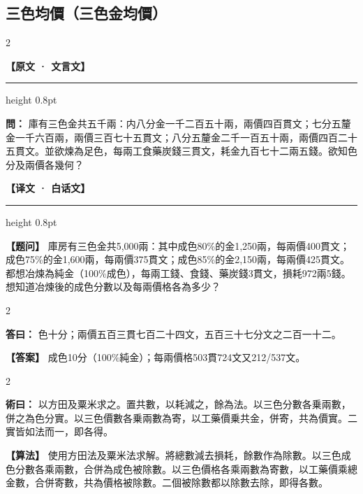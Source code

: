 \documentclass[11pt,a4paper]{article}
\newcommand{\ClassicalQuestion}[1]{\par\noindent\textbf{\color{problemcolor}問：}#1\par}
\newcommand{\ClassicalAnswer}[1]{\par\noindent\textbf{\color{answercolor}答曰：}#1\par}
\newcommand{\ClassicalMethod}[1]{\par\noindent\textbf{\color{methodcolor}術曰：}#1\par}
\newcommand{\ModernQuestion}[1]{\par\noindent\textbf{\color{modernlabel}【题问】}#1\par}
\newcommand{\ModernAnswer}[1]{\par\noindent\textbf{\color{answercolor}【答案】}#1\par}
\newcommand{\ModernMethod}[1]{\par\noindent\textbf{\color{methodcolor}【算法】}#1\par}
\newcommand{\ClassicalHeader}{%
  \begin{center}\textbf{\color{headerclassical}【原文 · 文言文】}\end{center}
  \vspace{-0.5em}
  \hrule height 0.8pt
  \vspace{0.5em}
}
\newcommand{\ModernHeader}{%
  \begin{center}\textbf{\color{headermodern}【译文 · 白话文】}\end{center}
  \vspace{-0.5em}
  \hrule height 0.8pt
  \vspace{0.5em}
}
\begin{document}
\subsection*{\color{sectioncolor}三色均價（三色金均價）}

\begin{paracol}{2}

\ClassicalHeader

\ClassicalQuestion{%
庫有三色金共五千兩：内八分金一千二百五十兩，兩價四百貫文；七分五釐金一千六百兩，兩價三百七十五貫文；八分五釐金二千一百五十兩，兩價四百二十五貫文。並欲煉為足色，每兩工食藥炭錢三貫文，耗金九百七十二兩五錢。欲知色分及兩價各幾何？}

\switchcolumn

\ModernHeader

\ModernQuestion{%
庫房有三色金共5,000兩：其中成色80\%的金1,250兩，每兩價400貫文；成色75\%的金1,600兩，每兩價375貫文；成色85\%的金2,150兩，每兩價425貫文。都想冶煉為純金（100\%成色），每兩工錢、食錢、藥炭錢3貫文，損耗972兩5錢。想知道冶煉後的成色分數以及每兩價格各為多少？
}

\end{paracol}

\begin{paracol}{2}

\ClassicalAnswer{%
色十分；兩價五百三貫七百二十四文，五百三十七分文之二百一十二。}

\switchcolumn

\ModernAnswer{%
成色10分（100\%純金）；每兩價格503貫724文又212/537文。
}

\end{paracol}

\begin{paracol}{2}

\ClassicalMethod{%
以方田及粟米求之。置共數，以耗減之，餘為法。以三色分數各乗兩數，併之為色分實。以三色價數各乗兩數為寄，以工藥價乗共金，併寄，共為價實。二實皆如法而一，即各得。}

\switchcolumn

\ModernMethod{%
使用方田法及粟米法求解。將總數減去損耗，餘數作為除數。以三色成色分數各乘兩數，合併為成色被除數。以三色價格各乘兩數為寄數，以工藥價乘總金數，合併寄數，共為價格被除數。二個被除數都以除數去除，即得各數。
}

\end{paracol}
\end{document}
